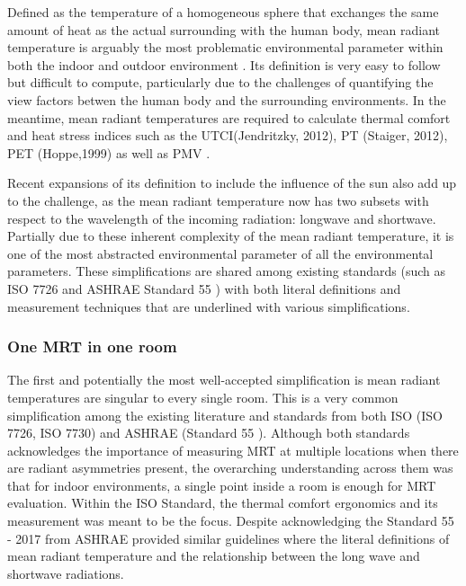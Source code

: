     Defined as the temperature of a homogeneous sphere that exchanges the same amount of heat as the actual surrounding with the human body, mean radiant temperature is arguably the most problematic environmental parameter within both the indoor and outdoor environment \cite{kantor_most_2011}. Its definition is very easy to follow but difficult to compute, particularly due to the challenges of quantifying the view factors betwen the human body and the surrounding environments. In the meantime, mean radiant temperatures are required to calculate thermal comfort and heat stress indices such as the UTCI(Jendritzky, 2012), PT (Staiger, 2012), PET (Hoppe,1999) as well as PMV \cite{fanger_calculation_1967}. 

    Recent expansions of its definition to include the influence of the sun also add up to the challenge, as the mean radiant temperature now has two subsets with respect to the wavelength of the incoming radiation: longwave and shortwave\cite{ansi/ashrae_standard_2017}. Partially due to these inherent complexity of the mean radiant temperature, it is one of the most abstracted environmental parameter of all the environmental parameters. These simplifications are shared among existing standards (such as ISO 7726 \cite{standardization_iso7726_2001} and ASHRAE Standard 55 \cite{ansi/ashrae_standard_2017}) with both literal definitions and measurement techniques that are underlined with various simplifications. 
    \subsubsection{One MRT in one room}
    The first and potentially the most well-accepted simplification is mean radiant temperatures are singular to every single room. This is a very common simplification among the existing literature and standards from both ISO (ISO 7726\cite{standardization_iso7726_2001}, ISO 7730\cite{iso_iso_2005}) and ASHRAE (Standard 55 \cite{ansi/ashrae_standard_2017}). Although both standards acknowledges the importance of measuring MRT at multiple locations when there are radiant asymmetries present, the overarching understanding across them was that for indoor environments, a single point inside a room is enough for MRT evaluation. 
    Within the ISO Standard, the thermal comfort ergonomics and its measurement was meant to be the focus. Despite acknowledging the  Standard 55 - 2017 from ASHRAE provided similar guidelines where the literal definitions of mean radiant temperature and the relationship between the long wave and shortwave radiations. 

